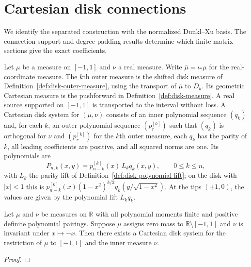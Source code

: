 
\chapter{Cartesian disk connections}\label{chap:disk-connections}
We identify the separated construction with the normalized Dunkl--Xu basis.
The connection support and degree-padding results determine which finite
matrix sections give the exact coefficients.

\begin{definition}
\label{def:cartesian-disk-system}
\leanok
Let $\mu$ be a measure on $[-1,1]$ and $\nu$ a real measure.
Write $\bar\mu=\iota_*\mu$ for the real-coordinate measure. The $k$th outer
measure is the shifted disk measure of Definition~\ref{def:disk-outer-measure},
using the transport of $\bar\mu$ to $D_k$. Its geometric Cartesian measure
is the pushforward in Definition~\ref{def:disk-measure}.
A real source supported on $[-1,1]$ is transported to the interval without loss. A Cartesian disk system for
$(\mu,\nu)$ consists of an inner polynomial sequence $(q_k)$ and, for each $k$,
an outer polynomial sequence $(p_r^{[k]})$ such that $(q_k)$ is orthogonal for
$\nu$ and $(p_r^{[k]})$ for the $k$th outer measure, each $q_k$ has the parity
of $k$, all leading coefficients are positive, and all squared norms are one.
Its polynomials are
\[
 P_{n,k}(x,y)=p_{n-k}^{[k]}(x)\,L_kq_k(x,y),\qquad 0\le k\le n,
\]
with $L_k$ the parity lift of Definition~\ref{def:disk-polynomial-lift}; on
the disk with $|x|<1$ this is
$p_{n-k}^{[k]}(x)(1-x^2)^{k/2}q_k(y/\sqrt{1-x^2})$.
At the tips $(\pm1,0)$, the values are given by the polynomial lift $L_kq_k$.
\end{definition}

\begin{theorem}
\label{thm:cartesian-disk-system-existence}
\leanok
Let $\mu$ and $\nu$ be measures on $\mathbb R$ with all polynomial moments
finite and positive definite polynomial pairings. Suppose $\mu$ assigns zero
mass to $\mathbb R\setminus[-1,1]$ and $\nu$ is invariant under $x\mapsto-x$.
Then there exists a Cartesian disk system for the restriction of $\mu$ to
$[-1,1]$ and the inner measure $\nu$.
\end{theorem}
\begin{proof}
\leanok
\end{proof}

